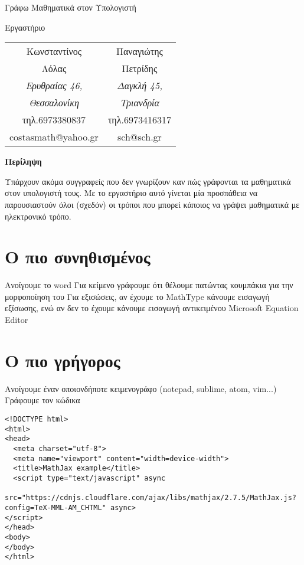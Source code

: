 \documentclass[12pt,titlepage]{article}
\begin{document}
\begin{titlepage}
 \begin{center}
  \Huge {Γράφω Μαθηματικά στον Υπολογιστή}

  \vspace{1.5cm}
  \Large {Εργαστήριο}
 \end{center}
 \vspace{2cm}
 \begin{center}

  \begin{tabular}{ c c }
   \Large{Κωνσταντίνος} & \Large{Παναγιώτης}\\
   \Large{Λόλας} & \Large{Πετρίδης} \\
   \textit{Ερυθραίας 46,} & \textit{Δαγκλή 45,} \\
   \textit{Θεσσαλονίκη} & \textit{Τριανδρία} \\
   τηλ.6973380837 & τηλ.6973416317\\
   costasmath@yahoo.gr & sch@sch.gr \\
  \end{tabular}

  \vspace{2cm}
  \textbf{Περίληψη}

  Υπάρχουν ακόμα συγγραφείς που δεν γνωρίζουν καν πώς γράφονται τα μαθηματικά στον υπολογιστή τους. Με το εργαστήριο αυτό γίνεται μία προσπάθεια να παρουσιαστούν όλοι (σχεδόν) οι τρόποι που μπορεί κάποιος να γράψει μαθηματικά με ηλεκτρονικό τρόπο.

 \end{center}

\end{titlepage}

\section{Ο πιο συνηθισμένος}
Ανοίγουμε το word
Για κείμενο γράφουμε ότι θέλουμε πατώντας κουμπάκια για την μορφοποίηση του
Για εξισώσεις, αν έχουμε το MathType κάνουμε εισαγωγή εξίσωσης, ενώ αν δεν το έχουμε κάνουμε εισαγωγή αντικειμένου Microsoft Equation Editor

\section{Ο πιο γρήγορος}
Ανοίγουμε έναν οποιονδήποτε κειμενογράφο (notepad, sublime, atom, vim...)
Γράφουμε τον κώδικα

\begin{verbatim}
<!DOCTYPE html>
<html>
<head>
  <meta charset="utf-8">
  <meta name="viewport" content="width=device-width">
  <title>MathJax example</title>
  <script type="text/javascript" async
  src="https://cdnjs.cloudflare.com/ajax/libs/mathjax/2.7.5/MathJax.js?config=TeX-MML-AM_CHTML" async>
</script>
</head>
<body>
</body>
</html>
\end{verbatim}
\end{document}
